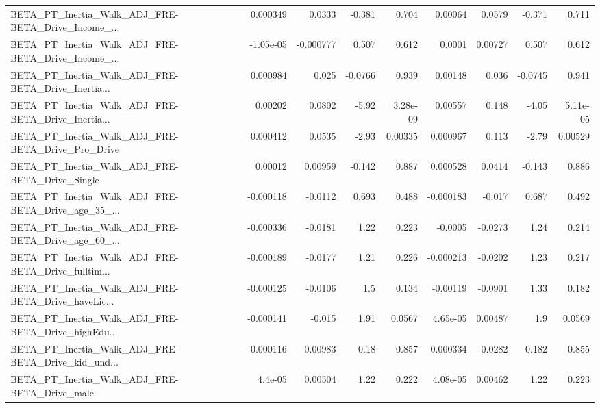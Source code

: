 \begin{tabular}{lrrrrrrrr}
BETA\_PT\_Inertia\_Walk\_ADJ\_FRE-BETA\_Drive\_Income\_... &    0.000349 &       0.0333 &   -0.381 &    0.704 &    0.00064 &      0.0579 &       -0.371 &         0.711 \\
BETA\_PT\_Inertia\_Walk\_ADJ\_FRE-BETA\_Drive\_Income\_... &   -1.05e-05 &    -0.000777 &    0.507 &    0.612 &     0.0001 &     0.00727 &        0.507 &         0.612 \\
BETA\_PT\_Inertia\_Walk\_ADJ\_FRE-BETA\_Drive\_Inertia... &    0.000984 &        0.025 &  -0.0766 &    0.939 &    0.00148 &       0.036 &      -0.0745 &         0.941 \\
BETA\_PT\_Inertia\_Walk\_ADJ\_FRE-BETA\_Drive\_Inertia... &     0.00202 &       0.0802 &    -5.92 & 3.28e-09 &    0.00557 &       0.148 &        -4.05 &      5.11e-05 \\
BETA\_PT\_Inertia\_Walk\_ADJ\_FRE-BETA\_Drive\_Pro\_Drive  &    0.000412 &       0.0535 &    -2.93 &  0.00335 &   0.000967 &       0.113 &        -2.79 &       0.00529 \\
BETA\_PT\_Inertia\_Walk\_ADJ\_FRE-BETA\_Drive\_Single     &     0.00012 &      0.00959 &   -0.142 &    0.887 &   0.000528 &      0.0414 &       -0.143 &         0.886 \\
BETA\_PT\_Inertia\_Walk\_ADJ\_FRE-BETA\_Drive\_age\_35\_... &   -0.000118 &      -0.0112 &    0.693 &    0.488 &  -0.000183 &      -0.017 &        0.687 &         0.492 \\
BETA\_PT\_Inertia\_Walk\_ADJ\_FRE-BETA\_Drive\_age\_60\_... &   -0.000336 &      -0.0181 &     1.22 &    0.223 &    -0.0005 &     -0.0273 &         1.24 &         0.214 \\
BETA\_PT\_Inertia\_Walk\_ADJ\_FRE-BETA\_Drive\_fulltim... &   -0.000189 &      -0.0177 &     1.21 &    0.226 &  -0.000213 &     -0.0202 &         1.23 &         0.217 \\
BETA\_PT\_Inertia\_Walk\_ADJ\_FRE-BETA\_Drive\_haveLic... &   -0.000125 &      -0.0106 &      1.5 &    0.134 &   -0.00119 &     -0.0901 &         1.33 &         0.182 \\
BETA\_PT\_Inertia\_Walk\_ADJ\_FRE-BETA\_Drive\_highEdu... &   -0.000141 &       -0.015 &     1.91 &   0.0567 &   4.65e-05 &     0.00487 &          1.9 &        0.0569 \\
BETA\_PT\_Inertia\_Walk\_ADJ\_FRE-BETA\_Drive\_kid\_und... &    0.000116 &      0.00983 &     0.18 &    0.857 &   0.000334 &      0.0282 &        0.182 &         0.855 \\
BETA\_PT\_Inertia\_Walk\_ADJ\_FRE-BETA\_Drive\_male       &     4.4e-05 &      0.00504 &     1.22 &    0.222 &   4.08e-05 &     0.00462 &         1.22 &         0.223 \\

\end{tabular}
